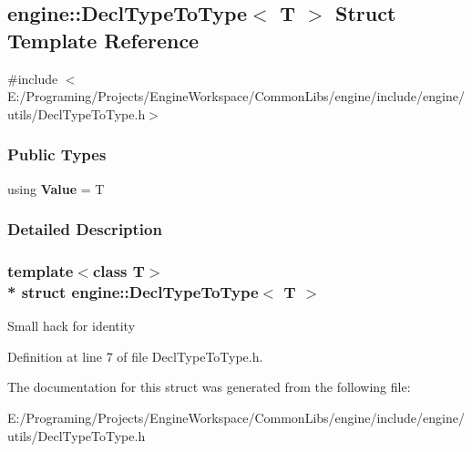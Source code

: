 \hypertarget{a00023}{}\subsection{engine\+:\+:Decl\+Type\+To\+Type$<$ T $>$ Struct Template Reference}
\label{a00023}


{\ttfamily \#include $<$E\+:/\+Programing/\+Projects/\+Engine\+Workspace/\+Common\+Libs/engine/include/engine/utils/\+Decl\+Type\+To\+Type.\+h$>$}

\subsubsection*{Public Types}
\begin{DoxyCompactItemize}
\item 
using {\bfseries Value} = T\hypertarget{a00023_ac81bef4a6e531b2b1c30e7c34ab704fc}{}\label{a00023_ac81bef4a6e531b2b1c30e7c34ab704fc}

\end{DoxyCompactItemize}


\subsubsection{Detailed Description}
\subsubsection*{template$<$class T$>$\\*
struct engine\+::\+Decl\+Type\+To\+Type$<$ T $>$}

Small hack for identity 

Definition at line 7 of file Decl\+Type\+To\+Type.\+h.



The documentation for this struct was generated from the following file\+:\begin{DoxyCompactItemize}
\item 
E\+:/\+Programing/\+Projects/\+Engine\+Workspace/\+Common\+Libs/engine/include/engine/utils/Decl\+Type\+To\+Type.\+h\end{DoxyCompactItemize}
